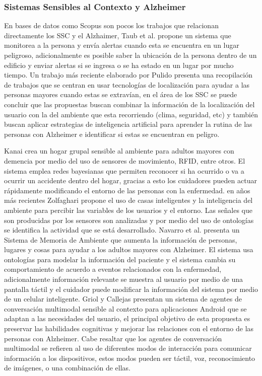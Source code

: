 \subsubsection{Sistemas Sensibles al Contexto y Alzheimer}
\label{subsubsec:CS_Apli_SSC}
En bases de datos como Scopus son pocos los trabajos que relacionan directamente los SSC y el Alzhaimer, Taub et al.\cite{Taub2011TheEscort} propone un sistema que monitorea a la persona y envía alertas cuando esta se encuentra en un lugar peligroso, adicionalmente es posible saber la ubicación de la persona dentro de un edificio y enviar alertas si se ingresa o se ha estado en un lugar por mucho tiempo. %
Un trabajo más reciente elaborado por Pulido \cite{PulidoHerrera2017} presenta una recopilación de trabajos que se centran en usar tecnologías de localización para ayudar a las personas mayores cuando estas se extravían, en el área de los SSC se puede concluir que las propuestas buscan combinar la información de la localización del usuario con la del ambiente que esta recorriendo (clima, seguridad, etc) y también buscan aplicar estrategias de inteligencia artificial para aprender la rutina de las personas con Alzheimer e identificar si estas se encuentran en peligro.

Kanai \cite{Kanai2012} crea un hogar grupal sensible al ambiente para adultos mayores con demencia por medio del uso de sensores de movimiento, RFID, entre otros. El sistema emplea redes bayesianas que permiten reconocer si ha ocurrido o va a ocurrir un accidente dentro del hogar, gracias a esto los cuidadores pueden actuar rápidamente modificando el entorno de las personas con la enfermedad.\cite{Zolfaghari2016} en años más recientes Zolfaghari propone el uso de casas inteligentes y la inteligencia del ambiente para percibir las variables de los usuarios y el entorno. Las señales que son producidas por los sensores son analizadas y por medio del uso de ontologías se identifica la actividad que se está desarrollado. %
Navarro et al. \cite{Navarro2012, Navarro2016} presenta un Sistema de Memoria de Ambiente que aumenta la información de personas, lugares y cosas para ayudar a los adultos mayores con Alzheimer. El sistema usa ontologías para modelar la información del paciente y el sistema cambia su comportamiento de acuerdo a eventos relacionados con la enfermedad, adicionalmente información relevante se muestra al usuario por medio de una pantalla táctil y el cuidador puede modificar la información del sistema por medio de un celular inteligente.%
Griol y Callejas \cite{Griol2016} presentan un sistema de agentes de conversación multimodal sensible al contexto para aplicaciones Android que se adaptan a las necesidades del usuario, el principal objetivo de esta propuesta es preservar las habilidades cognitivas y mejorar las relaciones con el entorno de las personas con Alzheimer. Cabe resaltar que los agentes de conversación multimodal se refieren al uso de diferentes modos de interacción para comunicar información a los dispositivos, estos modos pueden ser táctil, voz, reconocimiento de imágenes, o una combinación de ellas. %
\\

